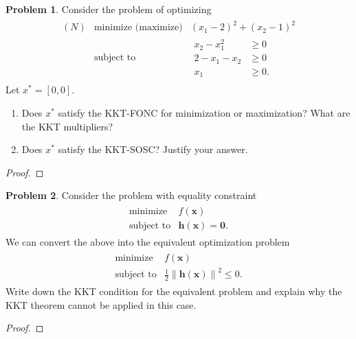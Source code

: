 \documentclass[12pt]{article}
\theoremstyle{definition}
\newtheorem{problem}{Problem}
\newcommand{\vc}[1]{\boldsymbol{#1}}
\newcommand{\norm}[1]{\left\lVert#1\right\rVert}
\begin{document}
\begin{problem}
  Consider the problem of optimizing
  \begin{align*}
    \begin{array}{rll}
      (N) & \text{minimize $($maximize$)$} & (x_1 - 2)^2 + (x_2 -1)^2 \\
      & \text{subject to} &
      \begin{array}{ll}
        x_2 - x_1^2 &\geq 0\\
        2 - x_1 - x_2 &\geq 0 \\
        x_1 &\geq 0.
      \end{array}
    \end{array}
  \end{align*}
  Let $x^* = [0, 0]$.
  \begin{enumerate}
    \item Does $x^*$ satisfy the KKT-FONC for minimization or maximization? What are the KKT
      multipliers?
    \item Does $x^*$ satisfy the KKT-SOSC? Justify your answer.
  \end{enumerate}
\end{problem}

\begin{proof}
\end{proof}
\newpage


\begin{problem}
  Consider the problem with equality constraint
  \begin{align*}
    \begin{array}{rl}
      \text{minimize} & f(\vc{x})\\
      \text{subject to} & \vc{h}(\vc{x}) = \vc{0}.
    \end{array}
  \end{align*}
  We can convert the above into the equivalent optimization problem
  \begin{align*}
    \begin{array}{rl}
      \text{minimize} & f(\vc{x})\\
      \text{subject to} & \frac{1}{2} \norm{\vc{h}(\vc{x})}^2 \leq 0.
    \end{array}
  \end{align*}
  Write down the KKT condition for the equivalent problem and explain why the KKT
  theorem cannot be applied in this case.
\end{problem}

\begin{proof}
\end{proof}
\end{document}
